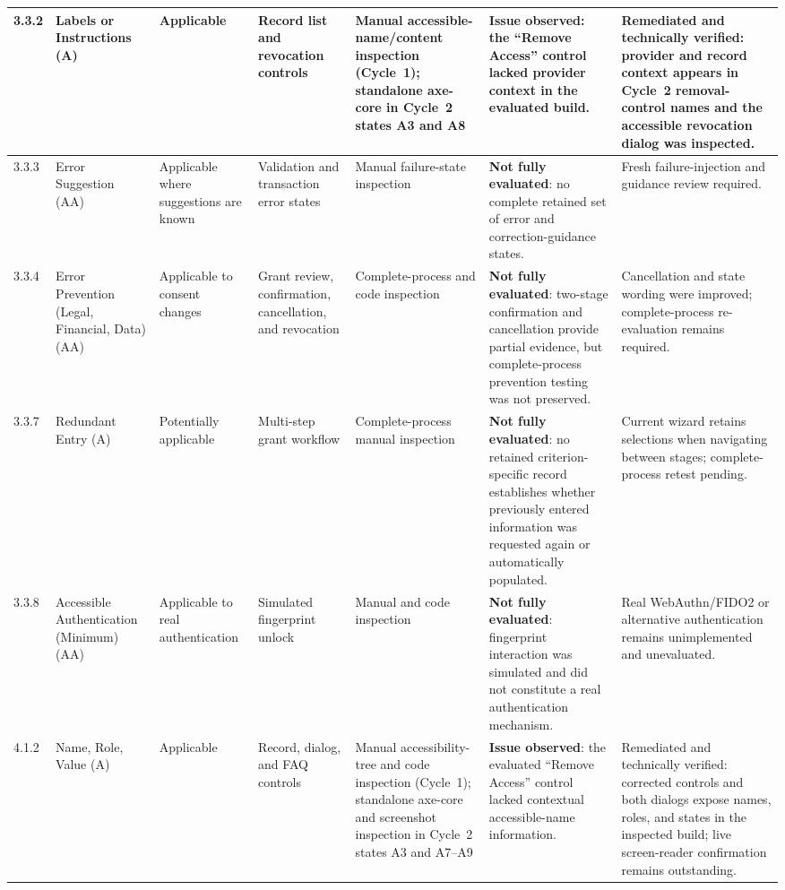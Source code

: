 \documentclass[10pt]{article}
\begin{document}
\begin{landscape}
{\begin{longtable}{|p{1.0cm}|p{3.3cm}|p{1.9cm}|p{2.7cm}|p{2.5cm}|p{4.1cm}|p{4.1cm}|}
3.3.2 & Labels or Instructions (A) & Applicable & Record list and revocation controls & Manual accessible-name/content inspection (Cycle~1); standalone axe-core in Cycle~2 states A3 and A8 & \textbf{Issue observed}: the ``Remove Access'' control lacked provider context in the evaluated build. & Remediated and technically verified: provider and record context appears in Cycle~2 removal-control names and the accessible revocation dialog was inspected.\\\hline
3.3.3 & Error Suggestion (AA) & Applicable where suggestions are known & Validation and transaction error states & Manual failure-state inspection & \textbf{Not fully evaluated}: no complete retained set of error and correction-guidance states. & Fresh failure-injection and guidance review required.\\\hline
3.3.4 & Error Prevention (Legal, Financial, Data) (AA) & Applicable to consent changes & Grant review, confirmation, cancellation, and revocation & Complete-process and code inspection & \textbf{Not fully evaluated}: two-stage confirmation and cancellation provide partial evidence, but complete-process prevention testing was not preserved. & Cancellation and state wording were improved; complete-process re-evaluation remains required.\\\hline
3.3.7 & Redundant Entry (A) & Potentially applicable & Multi-step grant workflow & Complete-process manual inspection & \textbf{Not fully evaluated}: no retained criterion-specific record establishes whether previously entered information was requested again or automatically populated. & Current wizard retains selections when navigating between stages; complete-process retest pending.\\\hline
3.3.8 & Accessible Authentication (Minimum) (AA) & Applicable to real authentication & Simulated fingerprint unlock & Manual and code inspection & \textbf{Not fully evaluated}: fingerprint interaction was simulated and did not constitute a real authentication mechanism. & Real WebAuthn/FIDO2 or alternative authentication remains unimplemented and unevaluated.\\\hline
4.1.2 & Name, Role, Value (A) & Applicable & Record, dialog, and FAQ controls & Manual accessibility-tree and code inspection (Cycle~1); standalone axe-core and screenshot inspection in Cycle~2 states A3 and A7--A9 & \textbf{Issue observed}: the evaluated ``Remove Access'' control lacked contextual accessible-name information. & Remediated and technically verified: corrected controls and both dialogs expose names, roles, and states in the inspected build; live screen-reader confirmation remains outstanding.\\\hline

\end{longtable}}
\end{landscape}
\end{document}
